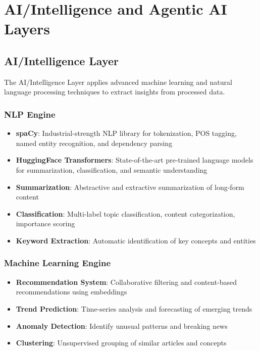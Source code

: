 \documentclass[12pt,a4paper]{report}
\begin{document}
\newpage


\chapter{AI/Intelligence and Agentic AI Layers}

\section{AI/Intelligence Layer}

The AI/Intelligence Layer applies advanced machine learning and natural language processing techniques to extract insights from processed data.

\subsection{NLP Engine}

\begin{itemize}[label=\textbullet]
    \item \textbf{spaCy}: Industrial-strength NLP library for tokenization, POS tagging, named entity recognition, and dependency parsing
    \item \textbf{HuggingFace Transformers}: State-of-the-art pre-trained language models for summarization, classification, and semantic understanding
    \item \textbf{Summarization}: Abstractive and extractive summarization of long-form content
    \item \textbf{Classification}: Multi-label topic classification, content categorization, importance scoring
    \item \textbf{Keyword Extraction}: Automatic identification of key concepts and entities
\end{itemize}

\subsection{Machine Learning Engine}

\begin{itemize}[label=\textbullet]
    \item \textbf{Recommendation System}: Collaborative filtering and content-based recommendations using embeddings
    \item \textbf{Trend Prediction}: Time-series analysis and forecasting of emerging trends
    \item \textbf{Anomaly Detection}: Identify unusual patterns and breaking news
    \item \textbf{Clustering}: Unsupervised grouping of similar articles and concepts
\end{itemize}
\end{document}
